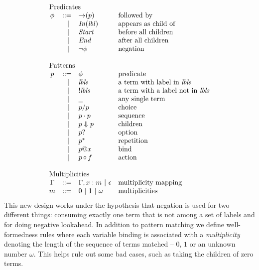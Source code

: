 \documentclass{article}
\makeatletter
\newcommand{\lbl}{\ensuremath{\mathit{lbl}}}
\newcommand{\lbls}{\ensuremath{\mathit{lbls}}}
\newcommand{\pseq}[2]{\ensuremath{#1 \cdot #2}}
\newcommand{\por}[2]{\ensuremath{#1/#2}}
\newcommand{\children}[2]{\ensuremath{#1} \Downarrow #2}
\newcommand{\pnot}[1]{\ensuremath{\lnot #1}}
\newcommand{\maybe}[1]{\ensuremath{#1?}}
\newcommand{\many}[1]{\ensuremath{#1^*}}
\newcommand{\any}{\ensuremath{\text{\underline{\hspace{0.6em}}}}}
\newcommand{\bind}[2]{\ensuremath{#1@#2}}
\newcommand{\paction}[2]{\ensuremath{#1\mathop{\circ} #2}}
\newcommand{\fb}[1]{\ensuremath{\mathop{\rightarrow}(#1)}}
\newcommand{\pin}[1]{\ensuremath{\mathit{In}(#1)}}
\newcommand{\pstart}{\ensuremath{\mathit{Start}}}
\newcommand{\pend}{\ensuremath{\mathit{End}}}
\newcommand{\arrayheading}[2]{\multicolumn{#1}{l}{\mbox{#2}}}
\makeatother
\begin{document}
\[
  \begin{array}{crll}
    \arrayheading{4}{Predicates}\\
      \phi & ::= & \fb{p}      & \text{followed by}         \\
           & ~|~ & \pin{\lbl}  & \text{appears as child of} \\
           & ~|~ & \pstart{}   & \text{before all children} \\
           & ~|~ & \pend{}     & \text{after all children}  \\
           & ~|~ & \pnot{\phi} & \text{negation}            \\
    \\
    \arrayheading{4}{Patterns}\\
      p & ::= & \phi            & \text{predicate}                          \\
        & ~|~ & \lbls           & \text{a term with label in $\lbls$}       \\
        & ~|~ & !\lbls          & \text{a term with a label not in $\lbls$} \\
        & ~|~ & \any{}          & \text{any single term}                    \\
        & ~|~ & \por{p}{p}      & \text{choice}                             \\
        & ~|~ & \pseq{p}{p}     & \text{sequence}                           \\
        & ~|~ & \children{p}{p} & \text{children}                           \\
        & ~|~ & \maybe{p}       & \text{option}                             \\
        & ~|~ & \many{p}        & \text{repetition}                         \\
        & ~|~ & \bind{p}{x}     & \text{bind}                               \\
        & ~|~ & \paction{p}{f}  & \text{action}                             \\
    \\
    \arrayheading{4}{Multiplicities}\\
    \Gamma & ::= & \Gamma, x : m ~|~ \epsilon & \text{multiplicity mapping}\\
    m      & ::= & 0 ~|~ 1 ~|~ \omega & \text{multiplicities}
  \end{array}
\]
%
This new design works under the hypothesis that negation is used
for two different things: consuming exactly one term that is not
among a set of labels and for doing negative lookahead.
%
In addition to pattern matching we define well-formedness rules
where each variable binding is associated with a
\emph{multiplicity} denoting the length of the sequence of terms
matched -- $0$, $1$ or an unknown number $\omega$. This helps rule
out some bad cases, such as taking the children of zero terms.
\end{document}
